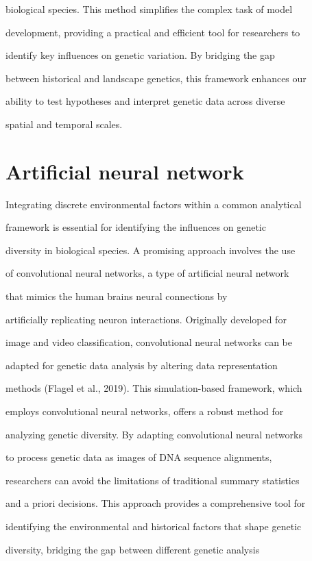 \documentclass[10pt,twoside]{article}
\numberwithin{equation}{section}
\begin{document}
biological species. This method simplifies the complex task of model

development, providing a practical and efficient tool for researchers to

identify key influences on genetic variation. By bridging the gap

between historical and landscape genetics, this framework enhances our

ability to test hypotheses and interpret genetic data across diverse

spatial and temporal scales.



\section{Artificial neural network}



Integrating discrete environmental factors within a common analytical

framework is essential for identifying the influences on genetic

diversity in biological species. A promising approach involves the use

of convolutional neural networks, a type of artificial neural network

that mimics the human brain\textquotesingle s neural connections by

artificially replicating neuron interactions. Originally developed for

image and video classification, convolutional neural networks can be

adapted for genetic data analysis by altering data representation

methods (Flagel et al., 2019). This simulation-based framework, which

employs convolutional neural networks, offers a robust method for

analyzing genetic diversity. By adapting convolutional neural networks

to process genetic data as images of DNA sequence alignments,

researchers can avoid the limitations of traditional summary statistics

and a priori decisions. This approach provides a comprehensive tool for

identifying the environmental and historical factors that shape genetic

diversity, bridging the gap between different genetic analysis
\end{document}
